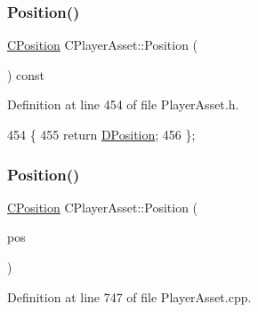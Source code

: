 \subsubsection{\texorpdfstring{Position()}{Position()}\hspace{0.1cm}{\footnotesize\ttfamily [1/2]}}
{\footnotesize\ttfamily \hyperlink{classCPosition}{C\+Position} C\+Player\+Asset\+::\+Position (\begin{DoxyParamCaption}{ }\end{DoxyParamCaption}) const\hspace{0.3cm}{\ttfamily [inline]}}



Definition at line 454 of file Player\+Asset.\+h.


\begin{DoxyCode}
454                                   \{
455             \textcolor{keywordflow}{return} \hyperlink{classCPlayerAsset_aa9f53c009b181c7c5647c6b03776a04c}{DPosition};  
456         \};
\end{DoxyCode}
\hypertarget{classCPlayerAsset_a8c3ed4ab81f79aa28faec6bf790a0a79}{}\label{classCPlayerAsset_a8c3ed4ab81f79aa28faec6bf790a0a79} 
\subsubsection{\texorpdfstring{Position()}{Position()}\hspace{0.1cm}{\footnotesize\ttfamily [2/2]}}
{\footnotesize\ttfamily \hyperlink{classCPosition}{C\+Position} C\+Player\+Asset\+::\+Position (\begin{DoxyParamCaption}\item[{const \hyperlink{classCPosition}{C\+Position} \&}]{pos }\end{DoxyParamCaption})}



Definition at line 747 of file Player\+Asset.\+cpp.


